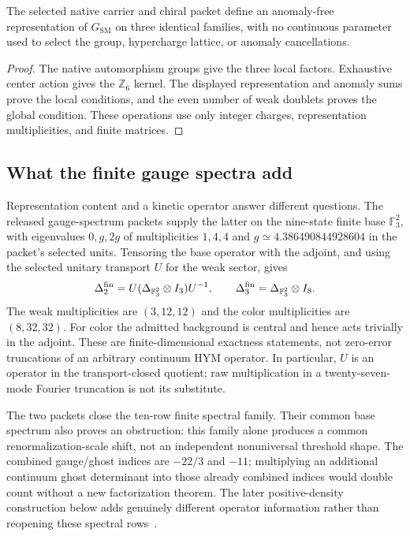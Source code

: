 \documentclass[11pt]{article}
\newcommand{\Z}{\mathbb{Z}}
\newcommand{\SM}{\mathrm{SM}}
\begin{document}
\begin{proposition}
The selected native carrier and chiral packet define an anomaly-free representation of
$G_{\SM}$ on three identical families, with no continuous parameter used to select the group,
hypercharge lattice, or anomaly cancellations.
\end{proposition}
\begin{proof}
The native automorphism groups give the three local factors.  Exhaustive center action gives
the $\Z_6$ kernel.  The displayed representation and anomaly sums prove the local conditions,
and the even number of weak doublets proves the global condition.  These operations use only
integer charges, representation multiplicities, and finite matrices.
\end{proof}

\subsection{What the finite gauge spectra add}

Representation content and a kinetic operator answer different questions.  The released
gauge-spectrum packets supply the latter on the nine-state finite base
$\mathbb F_3^2$, with eigenvalues $0,g,2g$ of multiplicities $1,4,4$ and
$g\simeq4.386490844928604$ in the packet's selected units.  Tensoring the base operator
with the adjoint, and using the selected unitary transport $U$ for the weak sector, gives
\begin{equation}
\Delta_2^{\rm fin}=U(\Delta_{\mathbb F_3^2}\otimes I_3)U^{-1},\qquad
\Delta_3^{\rm fin}=\Delta_{\mathbb F_3^2}\otimes I_8.
\end{equation}
The weak multiplicities are $(3,12,12)$ and the color multiplicities are $(8,32,32)$.
For color the admitted background is central and hence acts trivially in the adjoint.
These are finite-dimensional exactness statements, not zero-error truncations of an
arbitrary continuum HYM operator.  In particular, $U$ is an operator in the transport-closed
quotient; raw multiplication in a twenty-seven-mode Fourier truncation is not its substitute.

The two packets close the ten-row finite spectral family.  Their common base spectrum also
proves an obstruction: this family alone produces a common renormalization-scale shift,
not an independent nonuniversal threshold shape.  The combined gauge/ghost indices are
$-22/3$ and $-11$; multiplying an additional continuum ghost determinant into those already
combined indices would double count without a new factorization theorem.  The later
positive-density construction below adds genuinely different operator information rather
than reopening these spectral rows~\cite{SMFiniteSpectra}.
\end{document}
